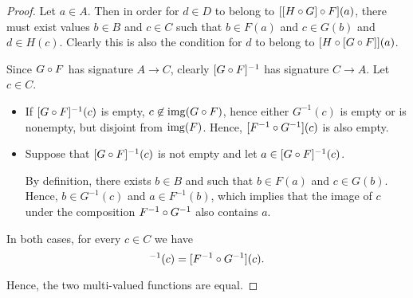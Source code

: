 \begin{proof}
   Let \( a \in A \). Then in order for \( d \in D \) to belong to \( [[H \bincirc G] \bincirc F](a) \), there must exist values \( b \in B \) and \( c \in C \) such that \( b \in F(a) \) and \( c \in G(b) \) and \( d \in H(c) \). Clearly this is also the condition for \( d \) to belong to \( [H \bincirc [G \bincirc F]](a) \).

   Since \( G \bincirc F \) has signature \( A \to C \), clearly \( [G \bincirc F]^{-1} \) has signature \( C \to A \). Let \( c \in C \).

  \begin{itemize}
    \item If \( [G \bincirc F]^{-1}(c) \) is empty, \( c \not\in \img(G \bincirc F) \), hence either \( G^{-1}(c) \) is empty or is nonempty, but disjoint from \( \operatorname{img}(F) \). Hence, \( [F^{-1} \bincirc G^{-1}](c) \) is also empty.

    \item Suppose that \( [G \bincirc F]^{-1}(c) \) is not empty and let \( a \in [G \bincirc F]^{-1}(c) \).

    By definition, there exists \( b \in B \) and such that \( b \in F(a) \) and \( c \in G(b) \). Hence, \( b \in G^{-1}(c) \) and \( a \in F^{-1}(b) \), which implies that the image of \( c \) under the composition \( F^{-1} \bincirc G^{-1} \) also contains \( a \).
  \end{itemize}

  In both cases, for every \( c \in C \) we have
  \begin{equation*}
    [G \bincirc F]^{-1}(c) = [F^{-1} \bincirc G^{-1}](c).
  \end{equation*}

  Hence, the two multi-valued functions are equal.
\end{proof}

